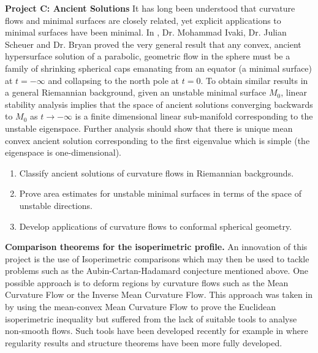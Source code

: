 \documentclass[12pt]{amsart}
\begin{document}
\noindent\textbf{Project C: Ancient Solutions}
\label{sec:orgheadline4}
It has long been understood that curvature flows and minimal surfaces are closely related, yet explicit applications to minimal surfaces have been minimal. In \cite{2016arXiv160401694B}, Dr. Mohammad Ivaki, Dr. Julian Scheuer and Dr. Bryan proved the very general result that any convex, ancient hypersurface solution of a parabolic, geometric flow in the sphere must be a family of shrinking spherical caps emanating from an equator (a minimal surface) at \(t=-\infty\) and collapsing to the north pole at \(t=0\). To obtain similar results in a general Riemannian background, given an unstable minimal surface \(M_0\), linear stability analysis implies that the space of ancient solutions converging backwards to \(M_0\) as \(t\to-\infty\) is a finite dimensional linear sub-manifold corresponding to the unstable eigenspace. Further analysis should show that there is unique mean convex ancient solution corresponding to the first eigenvalue which is simple (the eigenspace is one-dimensional).

\begin{enumerate}[label=\textbf{(C.\arabic*)}]
\item Classify ancient solutions of curvature flows in Riemannian backgrounds.
\item Prove area estimates for unstable minimal surfaces in terms of the space of unstable directions.
\item Develop applications of curvature flows to conformal spherical geometry.
\end{enumerate}

\smallskip{}
\label{sec:orgheadline14}

\noindent\textbf{Comparison theorems for the isoperimetric profile.}
\label{sec:orgheadline6}
An innovation of this project is the use of Isoperimetric comparisons which may then be used to tackle problems such as the Aubin-Cartan-Hadamard conjecture mentioned above. One possible approach is to deform regions by curvature flows such as the Mean Curvature Flow or the Inverse Mean Curvature Flow. This approach was taken in \cite{MR2420018} by using the mean-convex Mean Curvature Flow to prove the Euclidean isoperimetric inequality but suffered from the lack of suitable tools to analyse non-smooth flows. Such tools have been developed recently for example in \cite{MR3570481,2013arXiv1304.0926H} where regularity results and structure theorems have been more fully developed.
\end{document}
